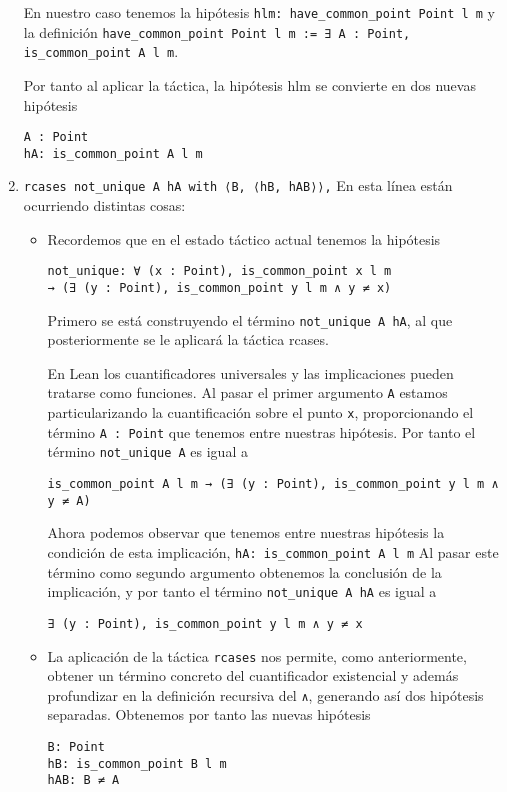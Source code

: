 \begin{enumerate}[label=L.\arabic*, topsep=0mm]
	      En nuestro caso tenemos la hipótesis \lstinline{hlm: have_common_point Point l m} y la definición
	      \lstinline{have_common_point Point l m := ∃ A : Point, is_common_point A l m}.

	      Por tanto al aplicar la táctica, la hipótesis hlm se convierte en dos
	      nuevas hipótesis
	      \begin{lstlisting}
A : Point 
hA: is_common_point A l m
\end{lstlisting}

	\item \lstinline{rcases not_unique A hA with ⟨B, ⟨hB, hAB⟩⟩,} En esta línea
	      están ocurriendo distintas cosas:
	      \begin{itemize}
		      \item Recordemos que en el estado táctico actual tenemos la hipótesis
		            \begin{lstlisting}
not_unique: ∀ (x : Point), is_common_point x l m 
→ (∃ (y : Point), is_common_point y l m ∧ y ≠ x) 
\end{lstlisting}

		            Primero se está construyendo el término \lstinline{not_unique A hA},
		            al que posteriormente se le aplicará la táctica {rcases}.

		            En Lean los cuantificadores universales y las implicaciones pueden
		            tratarse como funciones. Al pasar el primer argumento \lstinline{A}
		            estamos particularizando la cuantificación sobre el punto
		            \lstinline{x}, proporcionando el término \lstinline{A : Point} que
		            tenemos entre nuestras hipótesis. Por tanto el término
		            \lstinline{not_unique A} es igual a
		            \begin{lstlisting}
is_common_point A l m → (∃ (y : Point), is_common_point y l m ∧ y ≠ A)
\end{lstlisting}

		            Ahora podemos observar que tenemos entre nuestras hipótesis la
		            condición de esta implicación, \lstinline{hA: is_common_point A l m}
		            Al pasar este término como segundo argumento obtenemos la conclusión
		            de la implicación, y por tanto el término
		            \lstinline{not_unique A hA} es igual a
		            \begin{lstlisting}
∃ (y : Point), is_common_point y l m ∧ y ≠ x
\end{lstlisting}

		      \item La aplicación de la táctica \lstinline{rcases} nos permite, como
		            anteriormente, obtener un término concreto del cuantificador
		            existencial y además profundizar en la definición recursiva del
		            \lstinline{∧}, generando así dos hipótesis separadas. Obtenemos por
		            tanto las nuevas hipótesis
		            \begin{lstlisting}
B: Point 
hB: is_common_point B l m 
hAB: B ≠ A
\end{lstlisting}
	      \end{itemize}


\end{enumerate}
